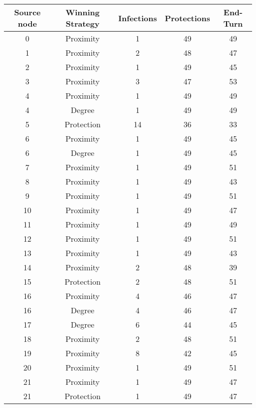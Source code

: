 \documentclass[results.tex]{subfiles}
\begin{document}
\begin{center}
  \begin{tabular}{| c || c | c | c | c |}
    \hline
    {\bfseries Source node} & {\bfseries Winning Strategy} & {\bfseries Infections} & {\bfseries Protections} & {\bfseries End-Turn} \\  %
    \hline\hline
    0 & Proximity & 1 & 49 & 49 \\ 
    \hline
    1 & Proximity & 2 & 48 & 47 \\ 
    \hline
    2 & Proximity & 1 & 49 & 45 \\ 
    \hline
    3 & Proximity & 3 & 47 & 53 \\ 
    \hline
    4 & Proximity & 1 & 49 & 49 \\ 
    \hline
    4 & Degree & 1 & 49 & 49 \\ 
    \hline
    5 & Protection & 14 & 36 & 33 \\ 
    \hline
    6 & Proximity & 1 & 49 & 45 \\ 
    \hline
    6 & Degree & 1 & 49 & 45 \\ 
    \hline
    7 & Proximity & 1 & 49 & 51 \\ 
    \hline
    8 & Proximity & 1 & 49 & 43 \\ 
    \hline
    9 & Proximity & 1 & 49 & 51 \\ 
    \hline
    10 & Proximity & 1 & 49 & 47 \\ 
    \hline
    11 & Proximity & 1 & 49 & 49 \\ 
    \hline
    12 & Proximity & 1 & 49 & 51 \\ 
    \hline
    13 & Proximity & 1 & 49 & 43 \\ 
    \hline
    14 & Proximity & 2 & 48 & 39 \\ 
    \hline
    15 & Protection & 2 & 48 & 51 \\ 
    \hline
    16 & Proximity & 4 & 46 & 47 \\ 
    \hline
    16 & Degree & 4 & 46 & 47 \\ 
    \hline
    17 & Degree & 6 & 44 & 45 \\ 
    \hline
    18 & Proximity & 2 & 48 & 51 \\ 
    \hline
    19 & Proximity & 8 & 42 & 45 \\ 
    \hline
    20 & Proximity & 1 & 49 & 51 \\ 
    \hline
    21 & Proximity & 1 & 49 & 47 \\ 
    \hline
    21 & Protection & 1 & 49 & 47 \\ 

\end{tabular}
\end{center}
\end{document}
